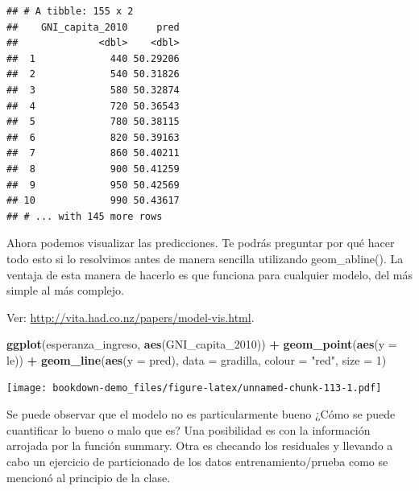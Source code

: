 \documentclass[]{book}
\newenvironment{Shaded}{\begin{snugshade}}{\end{snugshade}}
\newcommand{\KeywordTok}[1]{\textcolor[rgb]{0.13,0.29,0.53}{\textbf{#1}}}
\newcommand{\DataTypeTok}[1]{\textcolor[rgb]{0.13,0.29,0.53}{#1}}
\newcommand{\DecValTok}[1]{\textcolor[rgb]{0.00,0.00,0.81}{#1}}
\newcommand{\StringTok}[1]{\textcolor[rgb]{0.31,0.60,0.02}{#1}}
\newcommand{\OperatorTok}[1]{\textcolor[rgb]{0.81,0.36,0.00}{\textbf{#1}}}
\newcommand{\NormalTok}[1]{#1}
\theoremstyle{definition}
\theoremstyle{definition}
\theoremstyle{definition}
\theoremstyle{remark}
\begin{document}
\begin{Shaded}
\end{Shaded}

\begin{verbatim}
## # A tibble: 155 x 2
##    GNI_capita_2010     pred
##              <dbl>    <dbl>
##  1             440 50.29206
##  2             540 50.31826
##  3             580 50.32874
##  4             720 50.36543
##  5             780 50.38115
##  6             820 50.39163
##  7             860 50.40211
##  8             900 50.41259
##  9             950 50.42569
## 10             990 50.43617
## # ... with 145 more rows
\end{verbatim}

Ahora podemos visualizar las predicciones. Te podrás preguntar por qué
hacer todo esto si lo resolvimos antes de manera sencilla utilizando
geom\_abline(). La ventaja de esta manera de hacerlo es que funciona
para cualquier modelo, del más simple al más complejo.

Ver: \url{http://vita.had.co.nz/papers/model-vis.html}.

\begin{Shaded}
\begin{Highlighting}[]
\KeywordTok{ggplot}\NormalTok{(esperanza_ingreso, }\KeywordTok{aes}\NormalTok{(GNI_capita_}\DecValTok{2010}\NormalTok{)) }\OperatorTok{+}
\StringTok{  }\KeywordTok{geom_point}\NormalTok{(}\KeywordTok{aes}\NormalTok{(}\DataTypeTok{y =}\NormalTok{ le)) }\OperatorTok{+}
\StringTok{  }\KeywordTok{geom_line}\NormalTok{(}\KeywordTok{aes}\NormalTok{(}\DataTypeTok{y =}\NormalTok{ pred), }\DataTypeTok{data =}\NormalTok{ gradilla, }\DataTypeTok{colour =} \StringTok{"red"}\NormalTok{, }\DataTypeTok{size =} \DecValTok{1}\NormalTok{)}
\end{Highlighting}
\end{Shaded}

\texttt{[image: bookdown-demo\_files/figure-latex/unnamed-chunk-113-1.pdf]}

Se puede observar que el modelo no es particularmente bueno ¿Cómo se
puede cuantificar lo bueno o malo que es? Una posibilidad es con la
información arrojada por la función summary. Otra es checando los
residuales y llevando a cabo un ejercicio de particionado de los datos
entrenamiento/prueba como se mencionó al principio de la clase.
\end{document}
